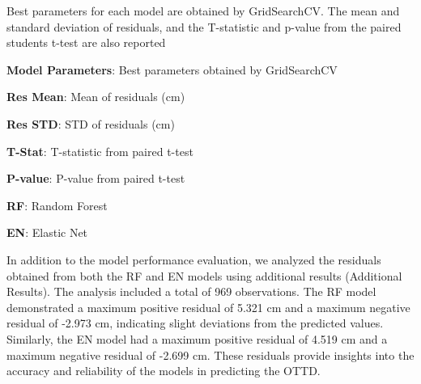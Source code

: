 \documentclass[11pt]{article}
\begin{document}
\begin{table}[h]
\caption{Hyperparameter tuning and performance evaluation for RF and EN}
\label{table:table1}
\begin{threeparttable}
\renewcommand{\TPTminimum}{\linewidth}
\begin{tablenotes}
\footnotesize
\item Best parameters for each model are obtained by GridSearchCV. The mean and standard deviation of residuals, and the T-statistic and p-value from the paired students t-test are also reported
\item \textbf{Model Parameters}: Best parameters obtained by GridSearchCV
\item \textbf{Res Mean}: Mean of residuals (cm)
\item \textbf{Res STD}: STD of residuals (cm)
\item \textbf{T-Stat}: T-statistic from paired t-test
\item \textbf{P-value}: P-value from paired t-test
\item \textbf{RF}: Random Forest
\item \textbf{EN}: Elastic Net
\end{tablenotes}
\end{threeparttable}
\end{table}


In addition to the model performance evaluation, we analyzed the residuals obtained from both the RF and EN models using additional results (Additional Results). The analysis included a total of 969 observations. The RF model demonstrated a maximum positive residual of 5.321 cm and a maximum negative residual of -2.973 cm, indicating slight deviations from the predicted values. Similarly, the EN model had a maximum positive residual of 4.519 cm and a maximum negative residual of -2.699 cm. These residuals provide insights into the accuracy and reliability of the models in predicting the OTTD.
\end{document}
